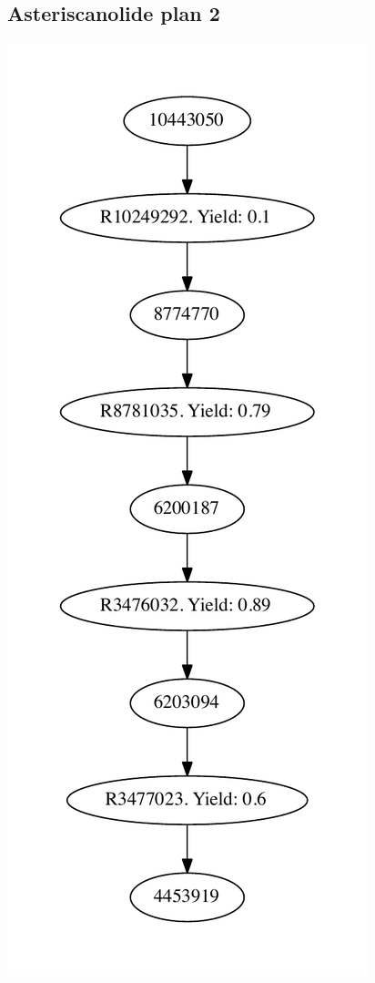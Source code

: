 \documentclass[a4paper,10pt,titlepage]{paper}
\begin{document}
\subsection{Asteriscanolide plan 2}
\centering
\includegraphics[scale=0.4]{Synteseplaner/Asteriscanolide/plan2.pdf}
\label{Appendix::Asteriscanolide2}
\end{document}
